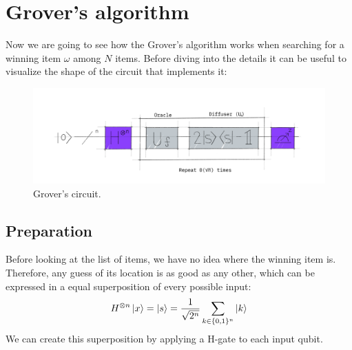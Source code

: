 \documentclass{article}
\begin{document}
\section{Grover's algorithm}

Now we are going to see how the Grover's algorithm works when searching for a
winning item $\omega$ among $N$ items.
Before diving into the details it can
be useful to visualize the shape of the circuit that implements it:
\begin{figure}[H]
  \centering
  \includegraphics[width=345pt]{Img/grover-circuit-high-level.png}
  \caption{Grover's circuit.}
\end{figure}

\subsection{Preparation}
Before looking at the list of items, we have no idea where the winning item
is. Therefore, any guess of its location is as good as any other, which can be
expressed in a equal superposition of
  every possible input:
  \[
    H^{\otimes n} \ket{x} = \ket{s} = \frac{1}{\sqrt{2^n}} \sum_{k \in
    \{0, 1\}^n}
    \ket{k}
  \]
  We can create this superposition by applying a H-gate to each input qubit.
\end{document}
